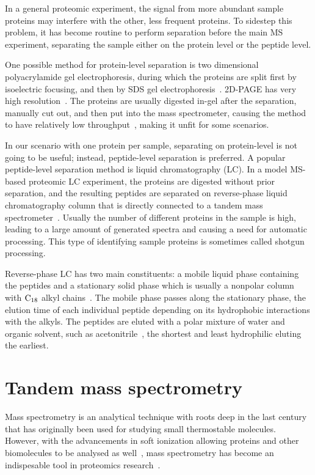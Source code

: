 In a general proteomic experiment, the signal from more abundant sample proteins may interfere with the other, less frequent proteins. To sidestep this problem, it has become routine to perform separation before the main MS experiment, separating the sample either on the protein level or the peptide level.

One possible method for protein-level separation is two dimensional polyacrylamide gel electrophoresis, during which the proteins are split first by isoelectric focusing, and then by SDS gel electrophoresis~\cite{o1975high}. 2D-PAGE has very high resolution~\cite{klose1995two}. The proteins are usually digested in-gel after the separation, manually cut out, and then put into the mass spectrometer, causing the method to have relatively low throughput~\cite{patton2002two}, making it unfit for some scenarios.

In our scenario with one protein per sample, separating on protein-level is not going to be useful; instead, peptide-level separation is preferred. A popular peptide-level separation method is liquid chromatography (LC). In a model MS-based proteomic LC experiment, the proteins are digested without prior separation, and the resulting peptides are separated on reverse-phase liquid chromatography column that is directly connected to a tandem mass spectrometer~\cite{washburn2001large}. Usually the number of different proteins in the sample is high, leading to a large amount of generated spectra and causing a need for automatic processing. This type of identifying sample proteins is sometimes called shotgun processing.

Reverse-phase LC has two main constituents: a mobile liquid phase containing the peptides and a stationary solid phase which is usually a nonpolar column with \(\ce{C18}\) alkyl chains~\cite{chang1976high}. The mobile phase passes along the stationary phase, the elution time of each individual peptide depending on its hydrophobic interactions with the alkyls. The peptides are eluted with a polar mixture of water and organic solvent, such as acetonitrile~\cite{frohlich2006proteome}, the shortest and least hydrophilic eluting the earliest.


\section{Tandem mass spectrometry}

Mass spectrometry is an analytical technique with roots deep in the last century that has originally been used for studying small thermostable molecules. However, with the advancements in soft ionization allowing proteins and other biomolecules to be analysed as well~\cite{fenn1989electrospray}, mass spectrometry has become an indispesable tool in proteomics research~\cite{collins2003human}.

